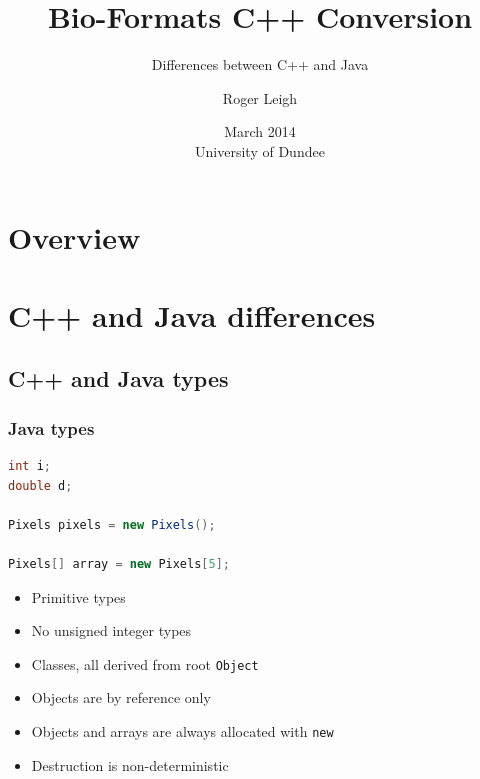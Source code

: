 \documentclass{beamer}
\title{Bio-Formats C++ Conversion}
\subtitle{Differences between C++ and Java}
\author{Roger Leigh}
\date{March 2014\\University of Dundee}
\begin{document}
\begin{frame}[plain]
  \titlepage
  \begin{center}
     \hfill
    \hfill
  \end{center}
\end{frame}

\section*{Overview}

\section{C++ and Java differences}
\subsection{C++ and Java types}

\begin{frame}[fragile]
  \frametitle{Java types}
  \begin{lstlisting}[language=Java]
int i;
double d;

Pixels pixels = new Pixels();

Pixels[] array = new Pixels[5];
\end{lstlisting}
  \begin{itemize}
    \pause
  \item Primitive types
    \pause
  \item No unsigned integer types
    \pause
  \item Classes, all derived from root \texttt{Object}
    \pause
  \item Objects are by reference only
    \pause
  \item Objects and arrays are always allocated with \texttt{new}
    \pause
  \item Destruction is non-deterministic
  \end{itemize}
\end{frame}
\end{document}

